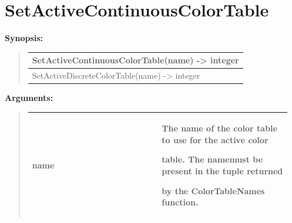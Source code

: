 \documentclass[letterpaper,10pt,english]{sphinxmanual}
\begin{document}
\section{SetActiveContinuousColorTable}
\label{functions:setactivecontinuouscolortable}
\begin{DUlineblock}{0em}
\item[] \textbf{Synopsis:}
\end{DUlineblock}
\begin{quote}

\begin{tabulary}{\linewidth}{|L|}
\hline

SetActiveContinuousColorTable(name) -\textgreater{} integer
\\
\hline
SetActiveDiscreteColorTable(name) -\textgreater{} integer
\\
\hline\end{tabulary}

\end{quote}

\begin{DUlineblock}{0em}
\item[] 
\item[] \textbf{Arguments:}
\end{DUlineblock}
\begin{quote}

\begin{tabular}{|p{0.475\linewidth}|p{0.475\linewidth}|}
\hline

name
 & 
\begin{DUlineblock}{0em}
\item[] The name of the color table to use for the active color
\item[] table. The namemust be present in the tuple returned
\item[] by the ColorTableNames function.
\end{DUlineblock}
\\
\hline\end{tabular}

\end{quote}
\end{document}
